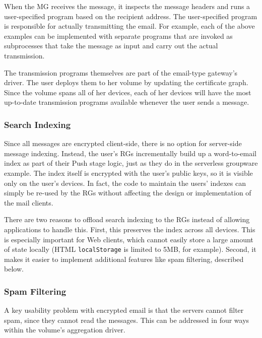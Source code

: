 When the MG receives the message, it inspects the message
headers and runs a user-specified program based on the recipient address.  The
user-specified program is responsible for actually transmitting the email.
For example, each of the above examples can be implemented with separate
programs that are invoked as subprocesses that take the message as input and
carry out the actual transmission.

The transmission programs themselves are part of the email-type gateway's driver.  The user
deploys them to her volume by updating the certificate graph.  Since the volume
spans all of her devices, each of her devices will have the most up-to-date
transmission programs available whenever the user sends a message.

\subsubsection{Search Indexing}

Since all messages are encrypted client-side, there is no option for server-side
message indexing.  Instead, the user's RGs incrementally build up a
word-to-email index as part of their Push stage logic, just as they do in the
serverless groupware example.  The index itself is
encrypted with the user's public keys, so it is visible only on the user's devices. 
In fact, the code to maintain the users' indexes can simply be re-used by the
RGs without affecting the design or implementation of the mail clients.

There are two reasons to offload search indexing to the RGs instead of allowing
applications to handle this.  First, this preserves the index across all devices. 
This is especially important for Web clients, which cannot easily store a large amount of state
locally (HTML \texttt{localStorage} is limited to 5MB, for example).  Second, it
makes it easier to implement additional features like spam filtering, described below.

\subsubsection{Spam Filtering}

A key usability problem with encrypted email is that the servers cannot filter spam,
since they cannot read the messages.  This can be addressed in four ways within
the volume's aggregation driver.

\hfill \break
{}
\hfill \break

